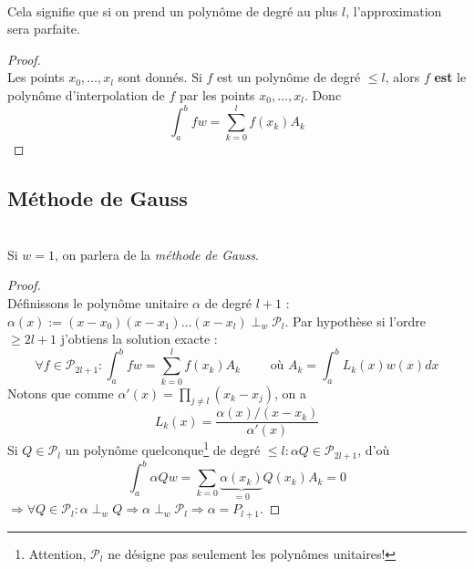 \ \\
Cela signifie que si on prend un polynôme de degré au plus $l$, l'approximation 
sera parfaite.
	
\begin{proof}\ \\
	Les points $x_0, \dots, x_l$ sont donnés. Si $f$ est un polynôme de degré $\leq 
	l$, alors $f$ \textbf{est} le polynôme d'interpolation de $f$ par les points 
	$x_0,\dots, x_l$. Donc
	\begin{equation}
		\int_a^b fw = \sum_{k=0}^l f(x_k)A_k
	\end{equation}
\end{proof}
	
\subsection{Méthode de Gauss}
\ \\
Si $w=1$, on parlera de la \textit{méthode de Gauss}.
	
\begin{proof}\ \\
	Définissons le polynôme unitaire $\alpha$ de degré $l+1$ : $\alpha(x) := (x-x_0)
	(x-x_1)	\dots(x-x_l) \perp_w \mathcal{P}_l$. Par hypothèse si l'ordre $\geq 2l+1$ 
	j'obtiens la solution exacte :
	\begin{equation}
		\forall f \in \mathcal{P}_{2l+1} : \int_a^b fw = \sum_{k=0}^l f(x_k)A_k\qquad 
		\text{ où } A_k = \int_a^b L_k(x)w(x)dx
	\end{equation}
	Notons que comme $\alpha'(x) = \prod_{j\neq l} (x_k-x_j)$, on a 
	\begin{equation}
		L_k(x) = \frac{\alpha(x)/(x-x_k)}{\alpha'(x)}
	\end{equation}
	Si $Q \in \mathcal{P}_l$ un polynôme quelconque\footnote{Attention, $\mathcal{P}_l$ 
		ne désigne pas seulement les polynômes unitaires!} de degré $\leq l : \alpha Q \in 
	\mathcal{P}_{2l+1}$, d'où
	\begin{equation}
		\int_a^b \alpha Q w = \sum_{k=0} \underbrace{\alpha(x_k)}_{=0}Q(x_k)A_k = 0
	\end{equation}
	$\Longrightarrow \forall Q \in \mathcal{P}_l : \alpha \perp_w Q \Rightarrow 
	\alpha \perp_w \mathcal{P}_l \Rightarrow \alpha = P_{l+1}$.
\end{proof}
	
